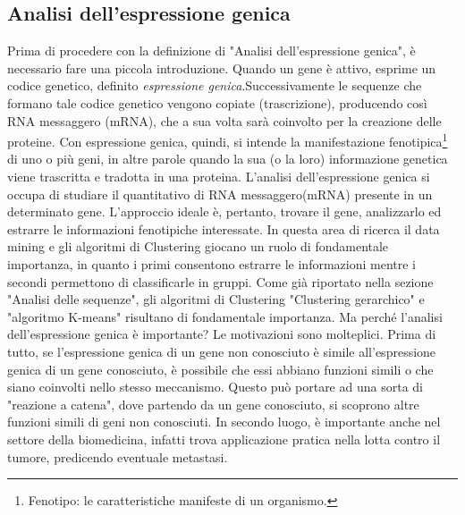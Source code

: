 \subsection{Analisi dell'espressione genica}
Prima di procedere con la definizione di "Analisi dell'espressione genica", è necessario fare una piccola introduzione. Quando un gene è attivo, esprime un codice genetico, definito \textit{espressione genica}.Successivamente le sequenze che formano tale codice genetico vengono copiate (trascrizione), producendo così RNA messaggero (mRNA), che a sua volta sarà coinvolto per la creazione delle proteine.
\newline
Con espressione genica, quindi, si intende la manifestazione fenotipica\footnote{Fenotipo: le caratteristiche manifeste di un organismo.} di uno o più geni, in altre parole quando la sua (o la loro) informazione genetica viene trascritta e tradotta in una proteina.
\newline
L'analisi dell'espressione genica si occupa di studiare il quantitativo di RNA messaggero(mRNA) presente in un determinato gene.
L'approccio ideale è, pertanto, trovare il gene, analizzarlo ed estrarre le informazioni fenotipiche interessate.
\newline
In questa area di ricerca il data mining e gli algoritmi di Clustering giocano un ruolo di fondamentale importanza, in quanto i primi consentono estrarre le informazioni mentre i secondi permettono di classificarle in gruppi. Come già riportato nella sezione "Analisi delle sequenze", gli algoritmi di Clustering "Clustering gerarchico" e "algoritmo K-means" risultano di fondamentale importanza.
\newline
Ma perché l'analisi dell'espressione genica è importante? Le motivazioni sono molteplici. Prima di tutto, se l'espressione genica di un gene non conosciuto è simile all'espressione genica di un  gene conosciuto, è possibile che essi abbiano funzioni simili o che siano coinvolti nello stesso meccanismo. Questo può portare ad una sorta di "reazione a catena", dove partendo da un gene conosciuto, si scoprono altre funzioni simili di geni non conosciuti. In secondo luogo, è importante anche nel settore della biomedicina, infatti trova applicazione pratica nella lotta contro il tumore, predicendo eventuale metastasi.


